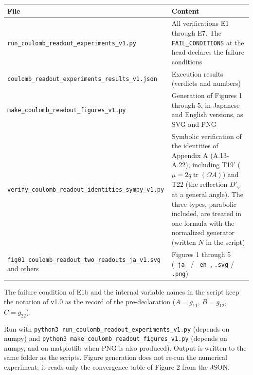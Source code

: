 \documentclass[
  a4paper,
]{article}
\newcounter{none} %
\begin{document}
{\def\LTcaptype{none} %
\begin{longtable}[]{@{}
  >{\raggedright\arraybackslash}p{}
  >{\raggedright\arraybackslash}p{}@{}}
\toprule\noalign{}
\begin{minipage}[b]{\linewidth}\raggedright
File
\end{minipage} & \begin{minipage}[b]{\linewidth}\raggedright
Content
\end{minipage} \\
\midrule\noalign{}
\endhead
\bottomrule\noalign{}
\endlastfoot
\texttt{run\_coulomb\_readout\_experiments\_v1.py} & All verifications
E1 through E7. The \texttt{FAIL\_CONDITIONS} at the head declares the
failure conditions \\
\texttt{coulomb\_readout\_experiments\_results\_v1.json} & Execution
results (verdicts and numbers) \\
\texttt{make\_coulomb\_readout\_figures\_v1.py} & Generation of Figures
1 through 5, in Japanese and English versions, as SVG and PNG \\
\texttt{verify\_coulomb\_readout\_identities\_sympy\_v1.py} & Symbolic
verification of the identities of Appendix A (A.13-A.22), including T19'
(\(\mu=2q\operatorname{tr}(\Omega A)\)) and T22 (the reflection
\(D'_\varphi\) at a general angle). The three types, parabolic included,
are treated in one formula with the normalized generator (written \(N\)
in the script) \\
\texttt{fig01\_coulomb\_readout\_two\_readouts\_ja\_v1.svg} and others &
Figures 1 through 5 (\texttt{\_ja\_} / \texttt{\_en\_}, \texttt{.svg} /
\texttt{.png}) \\
\end{longtable}
}

The failure condition of E1b and the internal variable names in the
script keep the notation of v1.0 as the record of the pre-declaration
(\(A=g_{11}\), \(B=g_{12}\), \(C=g_{22}\)).

Run with \texttt{python3\ run\_coulomb\_readout\_experiments\_v1.py}
(depends on numpy) and
\texttt{python3\ make\_coulomb\_readout\_figures\_v1.py} (depends on
numpy, and on matplotlib when PNG is also produced). Output is written
to the same folder as the scripts. Figure generation does not re-run the
numerical experiment; it reads only the convergence table of Figure 2
from the JSON.
\end{document}
